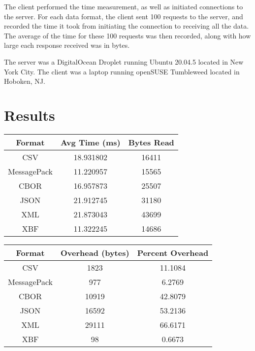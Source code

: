 \documentclass[conference]{IEEEtran}
\begin{document}
The client performed the time measurement, as well as initiated connections to the server. For each data format, the client sent 100 requests to the server, and recorded the time it took from initiating the connection to receiving all the data. The average of the time for these 100 requests was then recorded, along with how large each response received was in bytes.

The server was a DigitalOcean Droplet\cite{digital_ocean} running Ubuntu 20.04.5 located in New York City. The client was a laptop running openSUSE Tumbleweed located in Hoboken, NJ.

\section{Results}

\begin{table}[htbp]
	\begin{center}
		\begin{tabular}{|c|c|c|}
			\hline
			\textbf{Format} & \textbf{Avg Time (ms)} & \textbf{Bytes Read} \\
			\hline
			CSV             & 18.931802              & 16411               \\
			MessagePack     & 11.220957              & 15565               \\
			CBOR            & 16.957873              & 25507               \\
			JSON            & 21.912745              & 31180               \\
			XML             & 21.873043              & 43699               \\
			XBF             & 11.322245              & 14686               \\
			\hline
		\end{tabular}
	\end{center}\label{time_and_bytes}
\end{table}

\begin{table}[htbp]
	\begin{center}
		\begin{tabular}{|c|c|c|}
			\hline
			\textbf{Format} & \textbf{Overhead (bytes)} & \textbf{Percent Overhead} \\
			\hline
			CSV             & 1823                      & 11.1084                   \\
			MessagePack     & 977                       & 6.2769                    \\
			CBOR            & 10919                     & 42.8079                   \\
			JSON            & 16592                     & 53.2136                   \\
			XML             & 29111                     & 66.6171                   \\
			XBF             & 98                        & 0.6673                    \\
			\hline
		\end{tabular}
	\end{center}\label{overhead}
\end{table}
\end{document}
